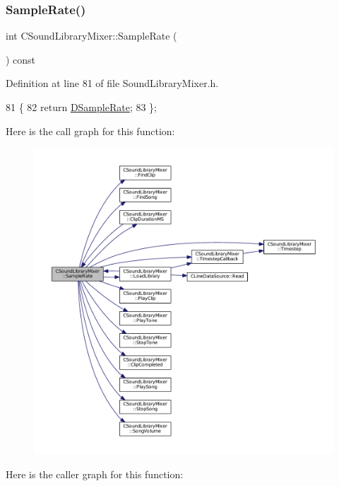 \subsubsection{\texorpdfstring{Sample\+Rate()}{SampleRate()}}
{\footnotesize\ttfamily int C\+Sound\+Library\+Mixer\+::\+Sample\+Rate (\begin{DoxyParamCaption}{ }\end{DoxyParamCaption}) const\hspace{0.3cm}{\ttfamily [inline]}}



Definition at line 81 of file Sound\+Library\+Mixer.\+h.


\begin{DoxyCode}
81                               \{
82             \textcolor{keywordflow}{return} \hyperlink{classCSoundLibraryMixer_af2d94eb0c2b55d92ff00d18a25cbed6a}{DSampleRate};  
83         \};
\end{DoxyCode}
Here is the call graph for this function\+:\nopagebreak
\begin{figure}[H]
\begin{center}
\leavevmode
\includegraphics[width=350pt]{classCSoundLibraryMixer_a03221f151dfe72381da5d0d0539bab94_cgraph}
\end{center}
\end{figure}
Here is the caller graph for this function\+:\nopagebreak
